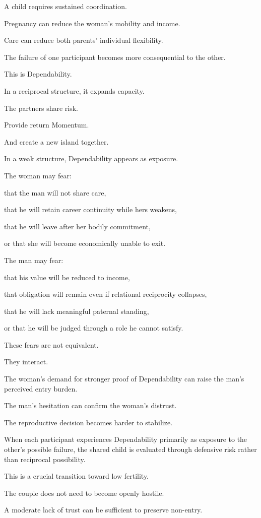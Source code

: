 A child requires sustained coordination.

Pregnancy can reduce the woman’s mobility and income.

Care can reduce both parents’ individual flexibility.

The failure of one participant becomes more consequential to the other.

This is Dependability.

In a reciprocal structure, it expands capacity.

The partners share risk.

Provide return Momentum.

And create a new island together.

In a weak structure, Dependability appears as exposure.

The woman may fear:

that the man will not share care,

that he will retain career continuity while hers weakens,

that he will leave after her bodily commitment,

or that she will become economically unable to exit.

The man may fear:

that his value will be reduced to income,

that obligation will remain even if relational reciprocity collapses,

that he will lack meaningful paternal standing,

or that he will be judged through a role he cannot satisfy.

These fears are not equivalent.

They interact.

The woman’s demand for stronger proof of Dependability can raise the man’s perceived entry burden.

The man’s hesitation can confirm the woman’s distrust.

The reproductive decision becomes harder to stabilize.

When each participant experiences Dependability primarily as exposure to the other’s possible failure, the shared child is evaluated through defensive risk rather than reciprocal possibility.

This is a crucial transition toward low fertility.

The couple does not need to become openly hostile.

A moderate lack of trust can be sufficient to preserve non-entry.

